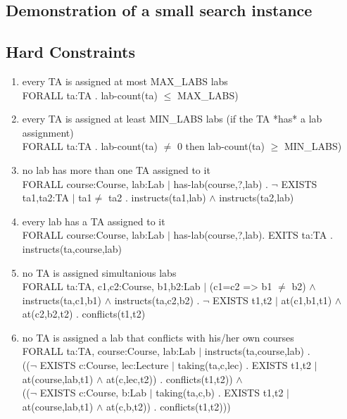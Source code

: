 \documentclass{article}
\begin{document}
\subsection{Demonstration of a small search instance}

\pagebreak
\begin{appendices}

  \section*{Hard Constraints}

  \begin{enumerate}
    
  \item every TA is assigned at most MAX\_LABS labs\\ FORALL ta:TA .
    lab-count(ta) $\leq$ MAX\_LABS)\\

  \item every TA is assigned at least MIN\_LABS labs (if the TA *has* a
    lab assignment)\\ FORALL ta:TA . lab-count(ta) $\not=$ 0 then
    lab-count(ta) $\geq$ MIN\_LABS)\\

  \item  no lab has more than one TA assigned to it\\ FORALL
    course:Course, lab:Lab $|$ has-lab(course,?,lab) . $\lnot$ EXISTS
    ta1,ta2:TA $|$ ta1$\not=$ ta2 . instructs(ta1,lab) $\land$
    instructs(ta2,lab)\\

  \item every lab has a TA assigned to it\\ FORALL course:Course, lab:Lab
    $|$ has-lab(course,?,lab). EXITS ta:TA . instructs(ta,course,lab)\\

  \item no TA is assigned simultanious labs\\ FORALL ta:TA, c1,c2:Course,
    b1,b2:Lab $|$ (c1=c2 => b1 $\not=$ b2) $\land$ instructs(ta,c1,b1)
    $\land$ instructs(ta,c2,b2) . $\lnot$ EXISTS t1,t2 $|$ at(c1,b1,t1)
    $\land$ at(c2,b2,t2) . conflicts(t1,t2)\\

  \item no TA is assigned a lab that conflicts with his/her own
    courses\\ FORALL ta:TA, course:Course, lab:Lab $|$
    instructs(ta,course,lab) .\\ (($\lnot$ EXISTS c:Course, lec:Lecture
    $|$ taking(ta,c,lec) . EXISTS t1,t2 $|$ at(course,lab,t1) $\land$
    at(c,lec,t2)) . conflicts(t1,t2)) $\land$\\ (($\lnot$ EXISTS
    c:Course, b:Lab $|$ taking(ta,c,b) . EXISTS t1,t2 $|$
    at(course,lab,t1) $\land$ at(c,b,t2)) . conflicts(t1,t2)))\\


\end{enumerate}
\end{appendices}
\end{document}
